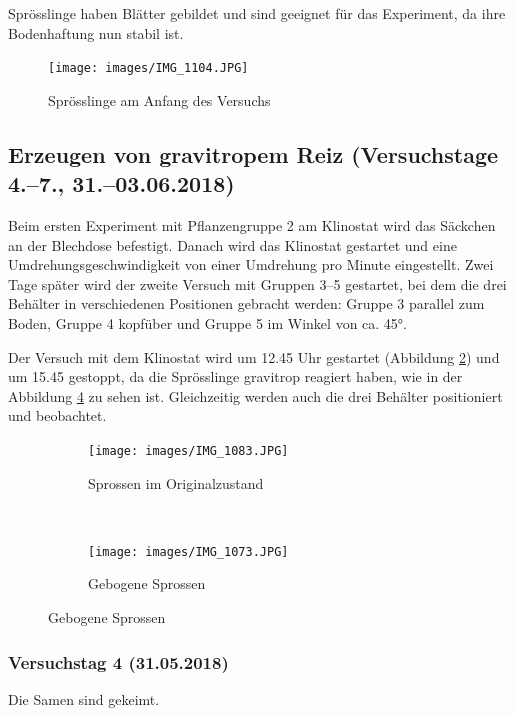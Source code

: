 \documentclass[
11pt, 
ngerman,
listof=totocnumbered,
oneside,
bibliography=totocnumbered,
abstracton
]{scrreprt}
\begin{document}
Sprösslinge haben Blätter gebildet und sind geeignet für das Experiment, da ihre Bodenhaftung nun stabil ist. 


\begin{figure}[H]
	\centering 
	\texttt{[image: images/IMG\_1104.JPG]}
	\caption{Sprösslinge am Anfang des Versuchs \label{Foto 6}}
\end{figure} 

\subsection{Erzeugen von gravitropem Reiz (Versuchstage 4.--7., 31.--03.06.2018)} 

Beim ersten Experiment mit Pflanzengruppe 2 am Klinostat wird das Säckchen an der Blechdose befestigt. Danach wird das Klinostat gestartet und eine Umdrehungsgeschwindigkeit von einer Umdrehung pro Minute eingestellt. Zwei Tage später wird der zweite Versuch mit Gruppen 3--5 gestartet, bei dem die drei Behälter in verschiedenen Positionen gebracht werden: Gruppe 3 parallel zum Boden, Gruppe 4 kopfüber und Gruppe 5 im Winkel von ca. \ang{45}.

Der Versuch mit dem Klinostat wird um 12.45 Uhr gestartet (Abbildung \ref{Foto 1}) und um 15.45 gestoppt, da die Sprösslinge gravitrop reagiert haben, wie in der Abbildung \ref{Foto 2} zu sehen ist. Gleichzeitig werden auch die drei Behälter positioniert und beobachtet.

\begin{figure}
	\centering
	\begin{subfigure}[b]{0.44\textwidth}
		\texttt{[image: images/IMG\_1083.JPG]}
		\caption{Sprossen im Originalzustand \label{Foto 1}}
		
	\end{subfigure}
	~ %
	\begin{subfigure}[b]{0.44\textwidth}
		\texttt{[image: images/IMG\_1073.JPG]}
		\caption{Gebogene Sprossen \label{Foto 2}}
	\end{subfigure}
\end{figure}

\subsubsection{Versuchstag 4 (31.05.2018)} 

Die Samen sind gekeimt. 
\end{document}
